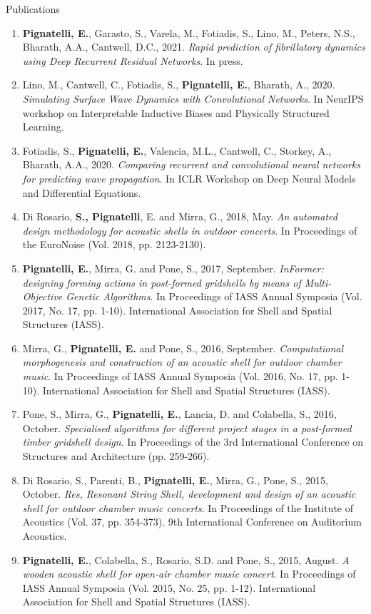 \documentclass{resume}
\begin{document}
\begin{rSection}{Publications}
    \begin{enumerate}[leftmargin=0.45cm, itemsep=0em, topsep=0.5em, parsep=0.2em]
        \item \textbf{Pignatelli, E.}, Garasto, S., Varela, M., Fotiadis, S., Lino, M., Peters, N.S., Bharath, A.A., Cantwell, D.C., 2021. \textit{Rapid prediction of fibrillatory dynamics using Deep Recurrent Residual Networks}. In press.
        \item Lino, M., Cantwell, C., Fotiadis, S., \textbf{Pignatelli, E.}, Bharath, A., 2020. \textit{Simulating Surface Wave Dynamics with Convolutional Networks}. In NeurIPS workshop on Interpretable Inductive Biases and Physically Structured Learning.
        \item Fotiadis, S., \textbf{Pignatelli, E.}, Valencia, M.L., Cantwell, C., Storkey, A., Bharath, A.A., 2020. \textit{Comparing recurrent and convolutional neural networks for predicting wave propagation}. In ICLR Workshop on Deep Neural Models and Differential Equations.
        \item Di Rosario, \textbf{S., Pignatelli}, E. and Mirra, G., 2018, May. \textit{An automated design methodology for acoustic shells in outdoor concerts}. In Proceedings of the EuroNoise (Vol. 2018, pp. 2123-2130).
        \item \textbf{Pignatelli, E.}, Mirra, G. and Pone, S., 2017, September. \textit{InFormer: designing forming actions in post-formed gridshells by means of Multi-Objective Genetic Algorithms}. In Proceedings of IASS Annual Symposia (Vol. 2017, No. 17, pp. 1-10). International Association for Shell and Spatial Structures (IASS).
        \item Mirra, G., \textbf{Pignatelli, E.} and Pone, S., 2016, September. \textit{Computational morphogenesis and construction of an acoustic shell for outdoor chamber music}. In Proceedings of IASS Annual Symposia (Vol. 2016, No. 17, pp. 1-10). International Association for Shell and Spatial Structures (IASS).
        \item Pone, S., Mirra, G., \textbf{Pignatelli, E.}, Lancia, D. and Colabella, S., 2016, October. \textit{Specialised algorithms for different project stages in a post-formed timber gridshell design}. In Proceedings of the 3rd International Conference on Structures and Architecture (pp. 259-266).
        \item Di Rosario, S., Parenti, B., \textbf{Pignatelli, E.}, Mirra, G., Pone, S., 2015, October. \textit{Res, Resonant String Shell, development and design of an acoustic shell for outdoor chamber music concerts}. In Proceedings of the Institute of Acoustics (Vol. 37, pp. 354-373). 9th International Conference on Auditorium Acoustics.
        \item \textbf{Pignatelli, E.}, Colabella, S., Rosario, S.D. and Pone, S., 2015, August. \textit{A wooden acoustic shell for open-air chamber music concert}. In Proceedings of IASS Annual Symposia (Vol. 2015, No. 25, pp. 1-12). International Association for Shell and Spatial Structures (IASS).
    \end{enumerate}
    \end{rSection}
\end{document}
